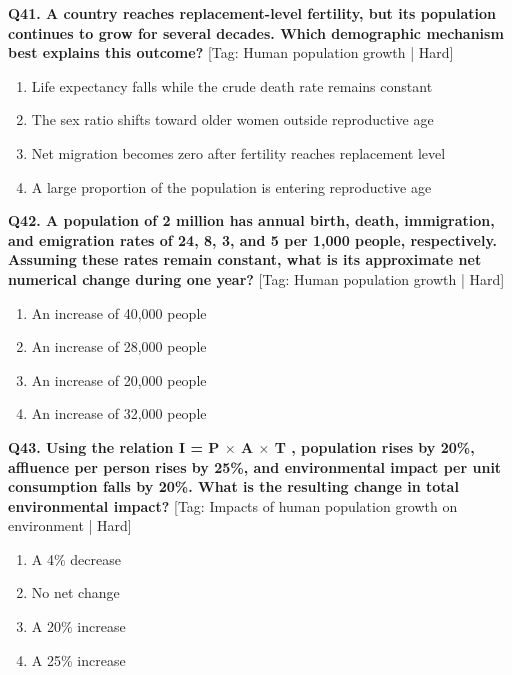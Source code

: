 \noindent\textbf{Q41. A country reaches replacement-level fertility, but its population continues to grow for several decades. Which demographic mechanism best explains this outcome?} \hfill [Tag: Human population growth | Hard]
\begin{enumerate}[label=(\alph*),topsep=2pt,itemsep=1pt,partopsep=0pt,parsep=0pt]
    \item {Life expectancy falls while the crude death rate remains constant}
    \item {The sex ratio shifts toward older women outside reproductive age}
    \item {Net migration becomes zero after fertility reaches replacement level}
    \item {A large proportion of the population is entering reproductive age}
\end{enumerate}
\vspace{2mm}

\noindent\textbf{Q42. A population of 2 million has annual birth, death, immigration, and emigration rates of 24, 8, 3, and 5 per 1,000 people, respectively. Assuming these rates remain constant, what is its approximate net numerical change during one year?} \hfill [Tag: Human population growth | Hard]
\begin{enumerate}[label=(\alph*),topsep=2pt,itemsep=1pt,partopsep=0pt,parsep=0pt]
    \item {An increase of 40,000 people}
    \item {An increase of 28,000 people}
    \item {An increase of 20,000 people}
    \item {An increase of 32,000 people}
\end{enumerate}
\vspace{2mm}

\noindent\textbf{Q43. Using the relation I = P $\times$ A $\times$ T , population rises by 20\%, affluence per person rises by 25\%, and environmental impact per unit consumption falls by 20\%. What is the resulting change in total environmental impact?} \hfill [Tag: Impacts of human population growth on environment | Hard]
\begin{enumerate}[label=(\alph*),topsep=2pt,itemsep=1pt,partopsep=0pt,parsep=0pt]
    \item {A 4\% decrease}
    \item {No net change}
    \item {A 20\% increase}
    \item {A 25\% increase}
\end{enumerate}
\vspace{2mm}

